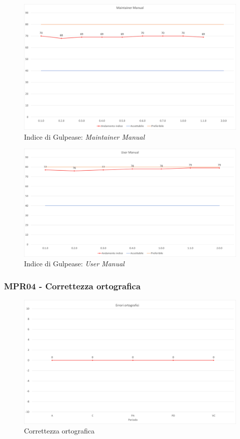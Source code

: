 \begin{figure}[!ht]
    \caption{Indice di Gulpease: \textit{Maintainer Manual}}
    \vspace{10px}
    \includegraphics[scale=0.5]{sezioni/immagini/MaintainerManualGulpease.png}
    \centering
\end{figure}
\pagebreak
\begin{figure}[!ht]
    \caption{Indice di Gulpease: \textit{User Manual}}
    \vspace{10px}
    \includegraphics[scale=0.5]{sezioni/immagini/UserManualGulpease.png}
    \centering
\end{figure}
\pagebreak
\subsubsection{MPR04 - Correttezza ortografica}
\begin{figure}[!ht]
    \caption{Correttezza ortografica}
    \includegraphics[scale=0.5]{sezioni/immagini/CorrettezzaOrtografica.png}
    \centering
\end{figure}
